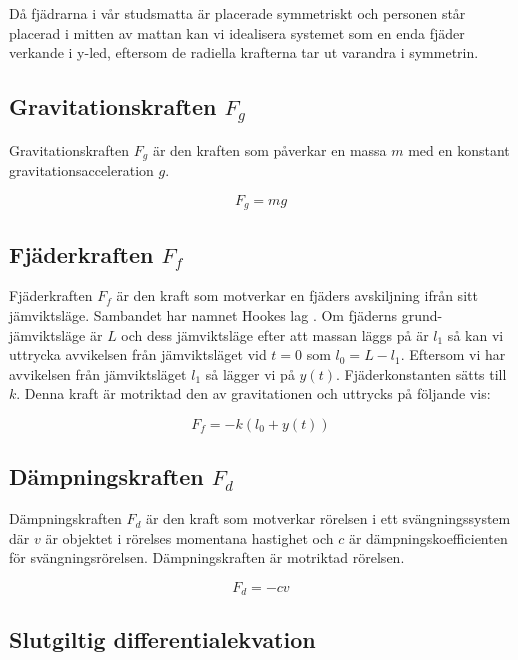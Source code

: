 \documentclass[10pt,a4paper]{article}
\begin{document}
Då fjädrarna i vår studsmatta är placerade symmetriskt och personen står placerad i mitten av mattan kan vi idealisera systemet som en enda fjäder verkande i y-led, eftersom de radiella krafterna tar ut varandra i symmetrin.

\subsection{Gravitationskraften $F_g$}

Gravitationskraften $F_g$ är den kraften som påverkar en massa $m$ med en konstant gravitationsacceleration $g$.

\begin{equation}
F_g = m  g
\end{equation}

\subsection{Fjäderkraften $F_f$}

Fjäderkraften $F_f$ är den kraft som motverkar en fjäders avskiljning ifrån sitt jämviktsläge. Sambandet har namnet Hookes lag 
\cite[s.~278]{randall2008}. Om fjäderns grund-\newline jämviktsläge är $L$ och dess jämviktsläge efter att massan läggs på är $l_1$ så kan vi uttrycka avvikelsen från jämviktsläget vid $t=0$ som $l_0 = L - l_1$. Eftersom vi har avvikelsen från jämviktsläget $l_1$ så lägger vi på $y(t)$. Fjäderkonstanten sätts till $k$. Denna kraft är motriktad den av gravitationen och uttrycks på följande vis:

\begin{equation}
F_f = -k (l_0 + y(t))
\end{equation}

\subsection{Dämpningskraften $F_d$}

Dämpningskraften $F_d$ är den kraft som motverkar rörelsen i ett svängningssystem där $v$ är objektet i rörelses momentana hastighet och $c$ är dämpningskoefficienten för svängningsrörelsen. Dämpningskraften är motriktad rörelsen.

\begin{equation}
F_d = -c  v
\end{equation}

\subsection{Slutgiltig differentialekvation}
\end{document}
